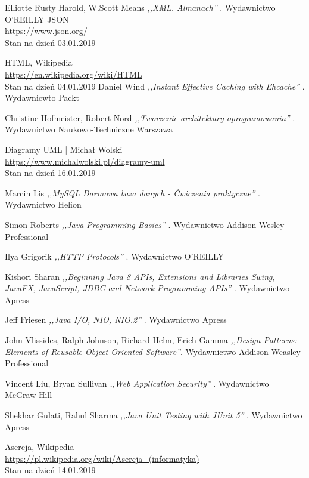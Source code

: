 \documentclass[12pt, twoside]{report}
\begin{document}
\begin{thebibliography}{9}
Elliotte Rusty Harold, W.Scott Means \emph{ ,,XML. Almanach'' }. Wydawnictwo O'REILLY
  JSON \\
  \url{https://www.json.org/} \\
  Stan na dzień 03.01.2019

    HTML, Wikipedia \\
	\url{https://en.wikipedia.org/wiki/HTML} \\
	Stan na dzień 04.01.2019
Daniel Wind \emph{ ,,Instant Effective Caching with Ehcache'' }. Wydawnicwto Packt

Christine Hofmeister, Robert Nord \emph{ ,,Tworzenie architektury oprogramowania'' }. Wydawnictwo Naukowo-Techniczne Warszawa

	Diagramy UML | Michał Wolski\\ \url{https://www.michalwolski.pl/diagramy-uml} \\
	Stan na dzień 16.01.2019
	
Marcin Lis \emph{ ,,MySQL Darmowa baza danych - Ćwiczenia praktyczne'' }. Wydawnictwo Helion


Simon Roberts \emph{ ,,Java Programming Basics'' }. Wydawnictwo Addison-Wesley Professional

Ilya Grigorik \emph{ ,,HTTP Protocols'' }. Wydawnictwo O'REILLY

Kishori Sharan \emph{ ,,Beginning Java 8 APIs, Extensions and Libraries Swing, JavaFX, JavaScript, JDBC and Network Programming APIs'' }. Wydawnictwo Apress
 
Jeff Friesen \emph{ ,,Java I/O, NIO, NIO.2'' }. Wydawnictwo Apress

John Vlissides, Ralph Johnson, Richard Helm, Erich Gamma \emph{ ,,Design Patterns: Elements of Reusable Object-Oriented Software''}. Wydawnictwo Addison-Weasley Professional

Vincent Liu, Bryan Sullivan \emph{ ,,Web Application Security'' }. Wydawnictwo McGraw-Hill

Shekhar Gulati, Rahul Sharma \emph{ ,,Java Unit Testing with JUnit 5'' }. Wydawnictwo Apress

Asercja, Wikipedia \\
\url{https://pl.wikipedia.org/wiki/Asercja_(informatyka)} \\
Stan na dzień 14.01.2019

\end{thebibliography}
\end{document}
